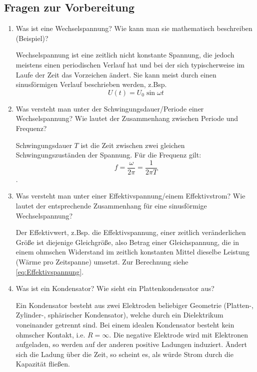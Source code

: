 \begin{tutorhint}
\section{Fragen zur Vorbereitung}

\begin{enumerate}
 \item Was ist eine Wechselspannung? Wie kann man sie mathematisch beschreiben (Beispiel)? 
		\begin{solution}
			Wechselspannung ist eine zeitlich nicht konstante Spannung, die jedoch meistens einen periodischen Verlauf hat und bei der sich typischerweise im Laufe der Zeit das Vorzeichen ändert. Sie kann meist durch einen sinusförmigen Verlauf beschrieben werden, z.Bsp.
			\begin{equation*}
				U(t) = U_0 \sin\omega t
			\end{equation*}
		\end{solution}
 \item Was versteht man unter der Schwingungsdauer/Periode einer Wechselspannung? Wie lautet der Zusammenhang zwischen Periode und Frequenz?
		\begin{solution}
			Schwingungsdauer $T$ ist die Zeit zwischen zwei gleichen Schwingungszuständen der Spannung. Für die Frequenz gilt: $$f = \frac{\omega}{2\pi} = \frac{1}{2\pi T}$$.
		\end{solution}
 \item Was versteht man unter einer Effektivspannung/einem Effektivstrom? Wie lautet der entsprechende Zusammenhang für eine sinusförmige Wechselspannung?
		\begin{solution}
			Der Effektivwert, z.Bsp. die Effektivspannung, einer zeitlich veränderlichen Größe ist diejenige Gleichgröße, also Betrag einer Gleichspannung, die in einem ohmschen Widerstand im zeitlich konstanten Mittel dieselbe Leistung (Wärme pro Zeitspanne) umsetzt. Zur Berechnung siehe \ref{eq:Effektivspannung}.
		\end{solution}
 \item Was ist ein Kondensator? Wie sieht ein Plattenkondensator aus?
		\begin{solution}
			Ein Kondensator besteht aus zwei Elektroden beliebiger Geometrie (Platten-, Zylinder-, sphärischer Kondensator), welche durch ein Dielektrikum voneinander getrennt sind. Bei einem idealen Kondensator besteht kein ohmscher Kontakt, i.e. $R=\infty$. Die negative Elektrode wird mit Elektronen aufgeladen, so werden auf der anderen positive Ladungen induziert. Ändert sich die Ladung über die Zeit, so scheint es, als würde Strom durch die Kapazität fließen.\\

\end{solution}
\end{enumerate}
\end{tutorhint}
